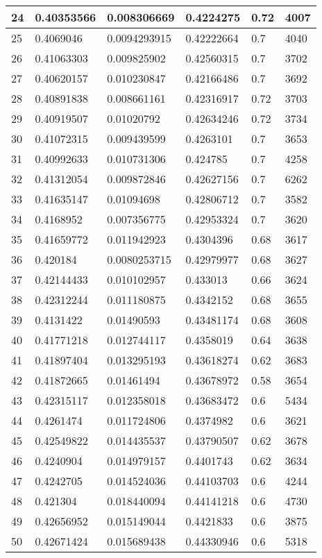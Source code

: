 \begin{longtable}{|l|l|l|l|l|l|}
24 & 0.40353566 & 0.008306669 & 0.4224275 & 0.72 & 4007 \\ \hline 
25 & 0.4069046 & 0.0094293915 & 0.42222664 & 0.7 & 4040 \\ \hline 
26 & 0.41063303 & 0.009825902 & 0.42560315 & 0.7 & 3702 \\ \hline 
27 & 0.40620157 & 0.010230847 & 0.42166486 & 0.7 & 3692 \\ \hline 
28 & 0.40891838 & 0.008661161 & 0.42316917 & 0.72 & 3703 \\ \hline 
29 & 0.40919507 & 0.01020792 & 0.42634246 & 0.72 & 3734 \\ \hline 
30 & 0.41072315 & 0.009439599 & 0.4263101 & 0.7 & 3653 \\ \hline 
31 & 0.40992633 & 0.010731306 & 0.424785 & 0.7 & 4258 \\ \hline 
32 & 0.41312054 & 0.009872846 & 0.42627156 & 0.7 & 6262 \\ \hline 
33 & 0.41635147 & 0.01094698 & 0.42806712 & 0.7 & 3582 \\ \hline 
34 & 0.4168952 & 0.007356775 & 0.42953324 & 0.7 & 3620 \\ \hline 
35 & 0.41659772 & 0.011942923 & 0.4304396 & 0.68 & 3617 \\ \hline 
36 & 0.420184 & 0.0080253715 & 0.42979977 & 0.68 & 3627 \\ \hline 
37 & 0.42144433 & 0.010102957 & 0.433013 & 0.66 & 3624 \\ \hline 
38 & 0.42312244 & 0.011180875 & 0.4342152 & 0.68 & 3655 \\ \hline 
39 & 0.4131422 & 0.01490593 & 0.43481174 & 0.68 & 3608 \\ \hline 
40 & 0.41771218 & 0.012744117 & 0.4358019 & 0.64 & 3638 \\ \hline 
41 & 0.41897404 & 0.013295193 & 0.43618274 & 0.62 & 3683 \\ \hline 
42 & 0.41872665 & 0.01461494 & 0.43678972 & 0.58 & 3654 \\ \hline 
43 & 0.42315117 & 0.012358018 & 0.43683472 & 0.6 & 5434 \\ \hline 
44 & 0.4261474 & 0.011724806 & 0.4374982 & 0.6 & 3621 \\ \hline 
45 & 0.42549822 & 0.014435537 & 0.43790507 & 0.62 & 3678 \\ \hline 
46 & 0.4240904 & 0.014979157 & 0.4401743 & 0.62 & 3634 \\ \hline 
47 & 0.4242705 & 0.014524036 & 0.44103703 & 0.6 & 4244 \\ \hline 
48 & 0.421304 & 0.018440094 & 0.44141218 & 0.6 & 4730 \\ \hline 
49 & 0.42656952 & 0.015149044 & 0.4421833 & 0.6 & 3875 \\ \hline 
50 & 0.42671424 & 0.015689438 & 0.44330946 & 0.6 & 5318 \\ \hline 
\end{longtable}